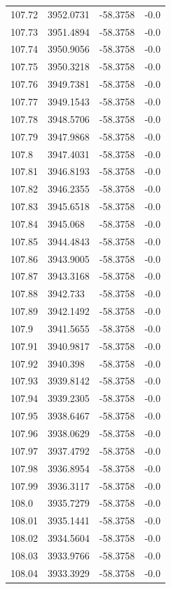 \begin{table}[H]
\begin{tabular}{llll}
107.72 & 3952.0731 & -58.3758 & -0.0 \\
107.73 & 3951.4894 & -58.3758 & -0.0 \\
107.74 & 3950.9056 & -58.3758 & -0.0 \\
107.75 & 3950.3218 & -58.3758 & -0.0 \\
107.76 & 3949.7381 & -58.3758 & -0.0 \\
107.77 & 3949.1543 & -58.3758 & -0.0 \\
107.78 & 3948.5706 & -58.3758 & -0.0 \\
107.79 & 3947.9868 & -58.3758 & -0.0 \\
107.8 & 3947.4031 & -58.3758 & -0.0 \\
107.81 & 3946.8193 & -58.3758 & -0.0 \\
107.82 & 3946.2355 & -58.3758 & -0.0 \\
107.83 & 3945.6518 & -58.3758 & -0.0 \\
107.84 & 3945.068 & -58.3758 & -0.0 \\
107.85 & 3944.4843 & -58.3758 & -0.0 \\
107.86 & 3943.9005 & -58.3758 & -0.0 \\
107.87 & 3943.3168 & -58.3758 & -0.0 \\
107.88 & 3942.733 & -58.3758 & -0.0 \\
107.89 & 3942.1492 & -58.3758 & -0.0 \\
107.9 & 3941.5655 & -58.3758 & -0.0 \\
107.91 & 3940.9817 & -58.3758 & -0.0 \\
107.92 & 3940.398 & -58.3758 & -0.0 \\
107.93 & 3939.8142 & -58.3758 & -0.0 \\
107.94 & 3939.2305 & -58.3758 & -0.0 \\
107.95 & 3938.6467 & -58.3758 & -0.0 \\
107.96 & 3938.0629 & -58.3758 & -0.0 \\
107.97 & 3937.4792 & -58.3758 & -0.0 \\
107.98 & 3936.8954 & -58.3758 & -0.0 \\
107.99 & 3936.3117 & -58.3758 & -0.0 \\
108.0 & 3935.7279 & -58.3758 & -0.0 \\
108.01 & 3935.1441 & -58.3758 & -0.0 \\
108.02 & 3934.5604 & -58.3758 & -0.0 \\
108.03 & 3933.9766 & -58.3758 & -0.0 \\
108.04 & 3933.3929 & -58.3758 & -0.0 \\

\end{tabular}
\end{table}
